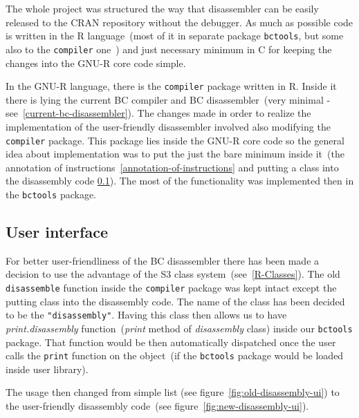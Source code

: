 \documentclass[thesis=M,english]{FITthesis}[2018/10/20]
\newcommand{\code}[1]{\texttt{#1}}
\begin{document}
The whole project was structured the way that disassembler can be easily released to the CRAN repository without the debugger. As much as possible code is written in the R language~(most of it in separate package \code{bctools}, but some also to the \code{compiler} one~\label{internal-parts-of-vm}) and just necessary minimum in C for keeping the changes into the GNU-R core code simple.

In the GNU-R language, there is the \code{compiler} package written in R. Inside it there is lying the current BC compiler and BC disassembler~(very minimal - see~\ref{current-bc-disassembler}). The changes made in order to realize the implementation of the user-friendly disassembler involved also modifying the \code{compiler} package. This package lies inside the GNU-R core code so the general idea about implementation was to put the just the bare minimum inside it~(the annotation of instructions~\ref{annotation-of-instructions} and putting a class into the disassembly code \ref{user-interface}). The most of the functionality was implemented then in the \code{bctools} package.

\subsection{User interface}\label{user-interface}

For better user-friendliness of the BC disassembler there has been made a decision to use the advantage of the S3 class system~(see~\ref{R-Classes}). The old \code{disassemble} function inside the \code{compiler} package was kept intact except the putting class into the disassembly code. The name of the class has been decided to be the \code{"disassembly"}. Having this class then allows us to have \textit{print.disassembly} function~(\textit{print} method of \textit{disassembly} class) inside our \code{bctools} package. That function would be then automatically dispatched once the user calls the \code{print} function on the object~(if the \code{bctools} package would be loaded inside user library).

The usage then changed from simple list (see figure~\ref{fig:old-disassembly-ui}) to the user-friendly disassembly code~(see figure~\ref{fig:new-disassembly-ui}).
\end{document}
